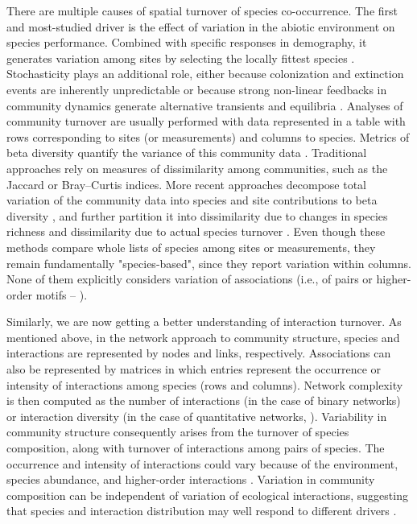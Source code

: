 \documentclass[12pt]{article}
\begin{document}
There are multiple causes of spatial turnover of species co-occurrence. The
first and most-studied driver is the effect of variation in the abiotic
environment on species performance. Combined with specific responses in
demography, it generates variation among sites by selecting the locally
fittest species \citep{Leibold2004a}. Stochasticity plays an additional role,
either because colonization and extinction events \citep{Hanski1999} are
inherently unpredictable or because strong non-linear feedbacks in community
dynamics generate alternative transients and equilibria \citep{Chase2007,
Vellend2014}. Analyses of community turnover are usually performed with data
represented in a table with rows corresponding to sites (or measurements) and
columns to species. Metrics of beta diversity quantify the variance of this
community data \citep{Legendre2005}. Traditional approaches rely on measures
of dissimilarity among communities, such as the Jaccard or Bray–Curtis
indices. More recent approaches decompose total variation of the community
data into species and site contributions to beta diversity
\citep{Legendre2013}, and further partition it into dissimilarity due to
changes in species richness and dissimilarity due to actual species turnover
\citep{Baselga2010}. Even though these methods compare whole lists of species
among sites or measurements, they remain fundamentally "species-based", since
they report variation within columns. None of them explicitly considers
variation of associations (i.e., of pairs or higher-order motifs –
\citealt{Stouffer2007}).

Similarly, we are now getting a better understanding of interaction turnover. As
mentioned above, in the network approach to community structure, species and
interactions are represented by nodes and links, respectively. Associations
can also be represented by matrices in which entries represent the occurrence
or intensity of interactions among species (rows and columns). Network
complexity is then computed as the number of interactions (in the case of
binary networks) or interaction diversity (in the case of quantitative
networks, \citealt{Bersier2002}). Variability in community structure
consequently arises from the turnover of species composition, along with
turnover of interactions among pairs of species. The occurrence and intensity
of interactions could vary because of the environment, species abundance, and
higher-order interactions \citep{Poisot2015a}. Variation in community
composition can be independent of variation of ecological
interactions, suggesting that species and interaction distribution may well
respond to different drivers \citep{Poisot2012}.
\end{document}
